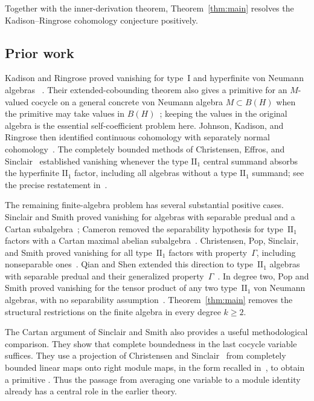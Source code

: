 Together with the inner-derivation theorem,
Theorem~\ref{thm:main} resolves the Kadison--Ringrose cohomology
conjecture positively.

\subsection{Prior work}

Kadison and Ringrose proved vanishing for type~I and hyperfinite von
Neumann algebras~\cite[Theorem~4.4]{KadisonRingrose1971}
\cite[Theorem~3.1]{KadisonRingrose1971II}. Their extended-cobounding
theorem also gives a primitive for an $M$-valued cocycle on a general
concrete von Neumann algebra $M\subset B(H)$ when the primitive may
take values in
$B(H)$~\cite[Theorem~2.4]{KadisonRingrose1971II}; keeping the values in
the original algebra is the essential self-coefficient problem here.
Johnson, Kadison, and Ringrose then identified continuous cohomology
with separately normal cohomology~\cite[Theorem~5.6]{JKR1972}.
The completely bounded methods of Christensen, Effros, and
Sinclair~\cite{CES1987} established vanishing whenever the type
$\mathrm{II}_1$ central summand absorbs the hyperfinite
$\mathrm{II}_1$ factor, including all algebras without a type
$\mathrm{II}_1$ summand; see the precise restatement
in~\cite[p.~636, equation~(1.1)]{CPSS2003}.

The remaining finite-algebra problem has several substantial positive
cases. Sinclair and Smith proved vanishing for algebras with separable
predual and a Cartan subalgebra~\cite{SinclairSmith1998Cartan};
Cameron removed the separability hypothesis for
type~$\mathrm{II}_1$ factors with a Cartan maximal abelian
subalgebra~\cite[Theorem~3.2]{Cameron2009}.
Christensen, Pop, Sinclair, and Smith proved vanishing for all
type~$\mathrm{II}_1$ factors with property~$\Gamma$, including
nonseparable ones~\cite[Theorem~7.2]{CPSS2003}.
Qian and Shen extended this direction to type~$\mathrm{II}_1$
algebras with separable predual and their generalized
property~$\Gamma$~\cite[Theorem~6.4]{QianShen2015}.
In degree two, Pop and Smith proved vanishing for the tensor product
of any two type~$\mathrm{II}_1$ von Neumann algebras, with no
separability assumption~\cite[Theorem~4.5]{PopSmith2010}.
Theorem~\ref{thm:main} removes the structural restrictions on the
finite algebra in every degree $k\geq2$.

The Cartan argument of Sinclair and Smith also provides a useful
methodological comparison. They show that complete boundedness in the
last cocycle variable suffices. They use a projection of Christensen
and Sinclair~\cite{ChristensenSinclair1995} from completely bounded
linear maps onto right module maps, in the form recalled
in~\cite[Theorem~3.4]{SinclairSmith1998}, to obtain a primitive
\cite[Section~4]{SinclairSmith1998}.
Thus the passage from averaging one variable to a module identity
already has a central role in the earlier theory.

